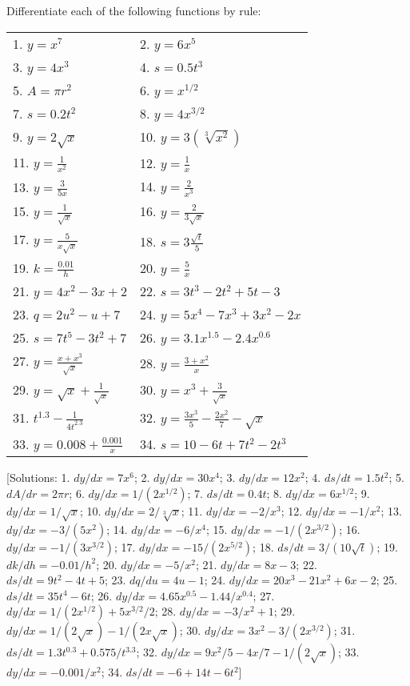 \documentclass[
  english,
  11pt,
  oneside]{book}
\newcommand{\slide}{}
\theoremstyle{definition}
\theoremstyle{definition}
\theoremstyle{definition}
\theoremstyle{definition}
\theoremstyle{remark}
\begin{document}
Differentiate each of the following functions by rule:

\begin{tabular}{l|l}
\hline
 & \\
\hline
1. $y=x^7$ & 2. $y=6x^5$\\
\hline
3. $y=4x^3$ & 4. $s=0.5t^3$\\
\hline
5. $A=\pi r^2$ & 6. $y=x^{1/2}$\\
\hline
7. $s=0.2t^2$ & 8. $y=4x^{3/2}$\\
\hline
9. $y=2\sqrt{x}$ & 10. $y=3(\sqrt[3]{x^2})$\\
\hline
11. $y=\frac1{x^2}$ & 12. $y=\frac 1x$\\
\hline
13. $y=\frac3{5x}$ & 14. $y=\frac2{x^3}$\\
\hline
15. $y=\frac1{\sqrt{x}}$ & 16. $y=\frac2{3\sqrt{x}}$\\
\hline
17. $y=\frac5{x\sqrt{x}}$ & 18. $s=3\frac{\sqrt{t}}5$\\
\hline
19. $k=\frac{0.01}{h}$ & 20. $y=\frac5x$\\
\hline
21. $y=4x^2-3x+2$ & 22. $s=3t^3-2t^2+5t-3$\\
\hline
23. $q=2u^2-u+7$ & 24. $y=5x^4-7x^3+3x^2-2x$\\
\hline
25. $s=7t^5-3t^2+7$ & 26. $y=3.1x^{1.5}-2.4x^{0.6}$\\
\hline
27. $y=\frac{x+x^3}{\sqrt{x}}$ & 28. $y=\frac{3+x^2}x$\\
\hline
29. $y=\sqrt{x}+\frac1{\sqrt{x}}$ & 30. $y=x^3+\frac3{\sqrt{x}}$\\
\hline
31. $t^{1.3}-\frac1{4t^{2.3}}$ & 32. $y=\frac{3x^3}5-\frac{2x^2}7-\sqrt{x}$\\
\hline
33. $y=0.008+\frac{0.001}{x}$ & 34. $s=10-6t+7t^2-2t^3$\\
\hline
\end{tabular}
\slide

{[}Solutions: 1. \(dy/dx=7x^6\); 2. \(dy/dx=30x^4\); 3. \(dy/dx=12x^2\); 4. \(ds/dt=1.5t^2\); 5. \(dA/dr=2\pi r\); 6. \(dy/dx=1/(2x^{1/2})\); 7. \(ds/dt=0.4t\); 8. \(dy/dx=6x^{1/2}\); 9. \(dy/dx=1/\sqrt{x}\); 10. \(dy/dx=2/\sqrt[3]{x}\); 11. \(dy/dx=-2/x^3\); 12. \(dy/dx=-1/x^2\); 13. \(dy/dx=-3/(5x^2)\); 14. \(dy/dx=-6/x^4\); 15. \(dy/dx=-1/(2x^{3/2})\); 16. \(dy/dx=-1/(3x^{3/2})\); 17. \(dy/dx=-15/(2x^{5/2})\); 18. \(ds/dt=3/(10\sqrt{t})\); 19. \(dk/dh=-0.01/h^2\); 20. \(dy/dx=-5/x^2\); 21. \(dy/dx=8x-3\); 22. \(ds/dt=9t^2-4t+5\); 23. \(dq/du=4u-1\); 24. \(dy/dx=20x^3-21x^2+6x-2\); 25. \(ds/dt=35t^4-6t\); 26. \(dy/dx=4.65x^{0.5}-1.44/x^{0.4}\); 27. \(dy/dx=1/(2x^{1/2})+5x^{3/2}/2\); 28. \(dy/dx=-3/x^2+1\); 29. \(dy/dx=1/(2\sqrt{x})-1/(2x\sqrt{x})\); 30. \(dy/dx=3x^2-3/(2x^{3/2})\); 31. \(ds/dt=1.3t^{0.3}+0.575/t^{3.3}\); 32. \(dy/dx=9x^2/5-4x/7-1/(2\sqrt{x})\); 33. \(dy/dx=-0.001/x^2\); 34. \(ds/dt=-6+14t-6t^2\){]}
\end{document}
